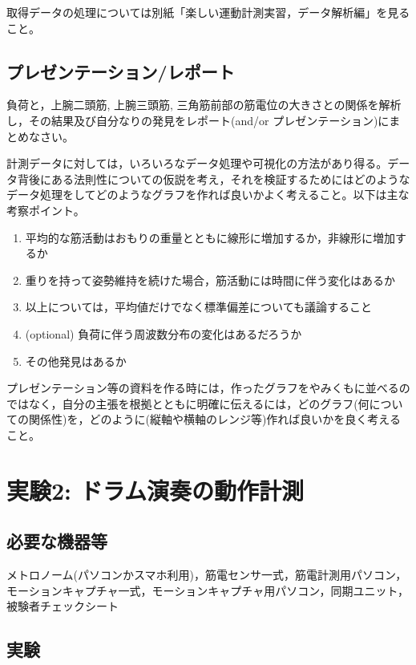 \documentclass{jsarticle}
\begin{document}
取得データの処理については別紙「楽しい運動計測実習，データ解析編」を見ること。

\subsection{プレゼンテーション/レポート}

負荷と，上腕二頭筋, 上腕三頭筋, 三角筋前部の筋電位の大きさとの関係を解析し，その結果及び自分なりの発見をレポート(and/or プレゼンテーション)にまとめなさい。

計測データに対しては，いろいろなデータ処理や可視化の方法があり得る。データ背後にある法則性についての仮説を考え，それを検証するためにはどのようなデータ処理をしてどのようなグラフを作れば良いかよく考えること。以下は主な考察ポイント。

\begin{enumerate}
  \item 平均的な筋活動はおもりの重量とともに線形に増加するか，非線形に増加するか
  \item 重りを持って姿勢維持を続けた場合，筋活動には時間に伴う変化はあるか
  \item 以上については，平均値だけでなく標準偏差についても議論すること
  \item (optional) 負荷に伴う周波数分布の変化はあるだろうか
  \item その他発見はあるか
\end{enumerate}

プレゼンテーション等の資料を作る時には，作ったグラフをやみくもに並べるのではなく，自分の主張を根拠とともに明確に伝えるには，どのグラフ(何についての関係性)を，どのように(縦軸や横軸のレンジ等)作れば良いかを良く考えること。


\section{実験2: ドラム演奏の動作計測}

\subsection{必要な機器等}

メトロノーム(パソコンかスマホ利用)，筋電センサ一式，筋電計測用パソコン，モーションキャプチャ一式，モーションキャプチャ用パソコン，同期ユニット，被験者チェックシート

\subsection{実験}
\end{document}
